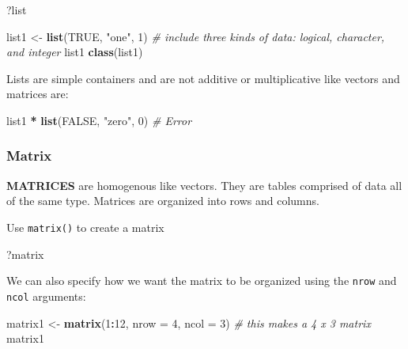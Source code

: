 \documentclass[]{article}
\newenvironment{Shaded}{\begin{snugshade}}{\end{snugshade}}
\newcommand{\KeywordTok}[1]{\textcolor[rgb]{0.13,0.29,0.53}{\textbf{#1}}}
\newcommand{\DataTypeTok}[1]{\textcolor[rgb]{0.13,0.29,0.53}{#1}}
\newcommand{\DecValTok}[1]{\textcolor[rgb]{0.00,0.00,0.81}{#1}}
\newcommand{\StringTok}[1]{\textcolor[rgb]{0.31,0.60,0.02}{#1}}
\newcommand{\CommentTok}[1]{\textcolor[rgb]{0.56,0.35,0.01}{\textit{#1}}}
\newcommand{\OtherTok}[1]{\textcolor[rgb]{0.56,0.35,0.01}{#1}}
\newcommand{\OperatorTok}[1]{\textcolor[rgb]{0.81,0.36,0.00}{\textbf{#1}}}
\newcommand{\NormalTok}[1]{#1}
\begin{document}
\begin{Shaded}
\begin{Highlighting}[]
\NormalTok{?list}

\NormalTok{list1 <-}\StringTok{ }\KeywordTok{list}\NormalTok{(}\OtherTok{TRUE}\NormalTok{, }\StringTok{"one"}\NormalTok{, }\DecValTok{1}\NormalTok{) }\CommentTok{# include three kinds of data: logical, character, and integer}
\NormalTok{list1}
\KeywordTok{class}\NormalTok{(list1)}
\end{Highlighting}
\end{Shaded}

Lists are simple containers and are not additive or multiplicative like
vectors and matrices are:

\begin{Shaded}
\begin{Highlighting}[]
\NormalTok{list1 }\OperatorTok{*}\StringTok{ }\KeywordTok{list}\NormalTok{(}\OtherTok{FALSE}\NormalTok{, }\StringTok{"zero"}\NormalTok{, }\DecValTok{0}\NormalTok{) }\CommentTok{# Error}
\end{Highlighting}
\end{Shaded}

\subsubsection{Matrix}\label{matrix}

\textbf{MATRICES} are homogenous like vectors. They are tables comprised
of data all of the same type. Matrices are organized into rows and
columns.

Use \texttt{matrix()} to create a matrix

\begin{Shaded}
\begin{Highlighting}[]
\NormalTok{?matrix}
\end{Highlighting}
\end{Shaded}

We can also specify how we want the matrix to be organized using the
\texttt{nrow} and \texttt{ncol} arguments:

\begin{Shaded}
\begin{Highlighting}[]
\NormalTok{matrix1 <-}\StringTok{ }\KeywordTok{matrix}\NormalTok{(}\DecValTok{1}\OperatorTok{:}\DecValTok{12}\NormalTok{, }\DataTypeTok{nrow =} \DecValTok{4}\NormalTok{, }\DataTypeTok{ncol =} \DecValTok{3}\NormalTok{) }\CommentTok{# this makes a 4 x 3 matrix}
\NormalTok{matrix1}
\end{Highlighting}
\end{Shaded}
\end{document}
